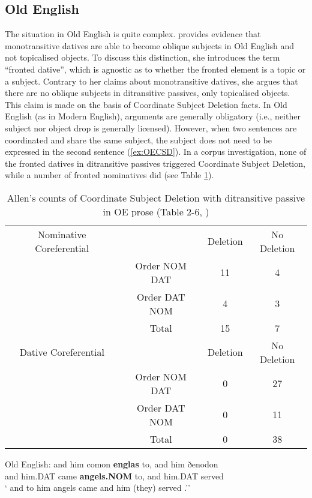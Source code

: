 \subsection{Old English}
	The situation in Old English is quite complex. \cite{Allen.1999} provides evidence that monotransitive datives are able to become oblique subjects in Old English and not topicalised objects. To discuss this distinction, she introduces the term ``fronted dative'', which is agnostic as to whether the fronted element is a topic or a subject. Contrary to her claims about monotransitive datives, she argues that there are no oblique subjects in ditransitive passives, only topicalised objects. This claim is made on the basis of Coordinate Subject Deletion facts. In Old English (as in Modern English), arguments are generally obligatory (i.e., neither subject nor object drop is generally licensed). However, when two sentences are coordinated and share the same subject, the subject does not need to be expressed in the second sentence (\ref{ex:OECSD}). In a corpus investigation, none of the fronted datives in ditransitive passives triggered Coordinate Subject Deletion, while a number of fronted nominatives did (see Table \ref{tab:AllenOECSD}). 

	\begin{table}[t]
		\begin{tabular}{cccc}
			Nominative Coreferential & & Deletion & No Deletion \\
			& Order NOM DAT & 11 & 4 \\
			& Order DAT NOM & 4 & 3 \\
			& Total & 15 & 7 \\
			\hline
			Dative Coreferential & & Deletion & No Deletion \\
			& Order NOM DAT & 0 & 27 \\
			& Order DAT NOM & 0 & 11 \\
			& Total & 0 & 38 \\
		\end{tabular}
		\caption{Allen's counts of Coordinate Subject Deletion with ditransitive passive in OE prose (Table 2-6, \citealt{Allen.1999})}
		\label{tab:AllenOECSD}
	\end{table}

	\begin{exe}
		\ex \label{ex:OECSD} Old English:
		\gll and him comon \textbf{englas} to, and him ðenodon\\
		and him.DAT came \textbf{angels.NOM} to, and him.DAT served\\
		\trans ` and to him angels came and him (they) served \citep[ex. 34]{Allen.1999}.''
	\end{exe}

